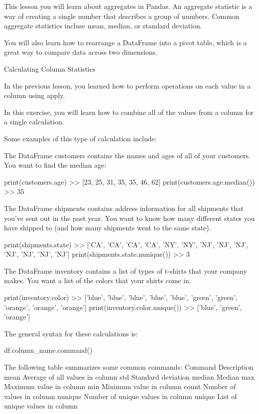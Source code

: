 \documentclass{journal}
\begin{document}
This lesson you will learn about aggregates in Pandas. An aggregate statistic is a way of creating a single number that describes a group of numbers. Common aggregate statistics incluse mean, median, or standard deviation.

You will also learn how to rearrange a DataFrame into a pivot table, which is a great way to compare data across two dimensions.



Calculating Column Statistics

In the previous lesson, you learned how to perform operations on each value in a column using apply.

In this exercise, you will learn how to combine all of the values from a column for a single calculation.

Some examples of this type of calculation include:

    The DataFrame customers contains the names and ages of all of your customers. You want to find the median age:

    print(customers.age)
    >> [23, 25, 31, 35, 35, 46, 62]
    print(customers.age.median())
    >> 35

    The DataFrame shipments contains address information for all shipments that you've sent out in the past year. You want to know how many different states you have shipped to (and how many shipments went to the same state).

    print(shipments.state)
    >> ['CA', 'CA', 'CA', 'CA', 'NY', 'NY', 'NJ', 'NJ', 'NJ', 'NJ', 'NJ', 'NJ', 'NJ']
    print(shipments.state.nunique())
    >> 3

    The DataFrame inventory contains a list of types of t-shirts that your company makes. You want a list of the colors that your shirts come in.

    print(inventory.color)
    >> ['blue', 'blue', 'blue', 'blue', 'blue', 'green', 'green', 'orange', 'orange', 'orange']
    print(inventory.color.unique())
    >> ['blue', 'green', 'orange']

The general syntax for these calculations is:

df.column_name.command()

The following table summarizes some common commands:
Command 	Description
mean 	Average of all values in column
std 	Standard deviation
median 	Median
max 	Maximum value in column
min 	Minimum value in column
count 	Number of values in column
nunique 	Number of unique values in column
unique 	List of unique values in column
\end{document}
